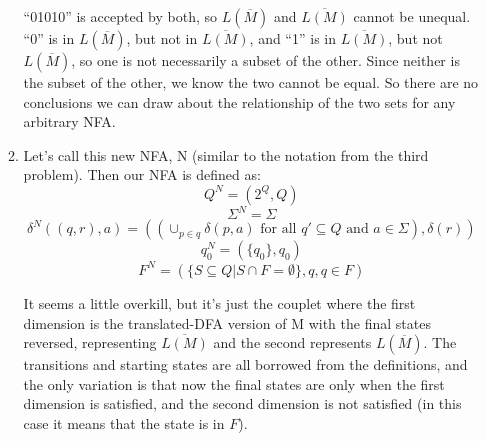 \begin{enumerate}
\begin{enumerate}
\begin{figure}[H]
      \end{figure}
      ``01010'' is accepted by both, so $L(\overline{M})$ and $\overline{L(M)}$ cannot be unequal. ``0'' is in $L(\overline{M})$, but not in $\overline{L(M)}$, and ``1'' is in $\overline{L(M)}$, but not $L(\overline{M})$, so one is not necessarily a subset of the other. Since neither is the subset of the other, we know the two cannot be equal. So there are no conclusions we can draw about the relationship of the two sets for any arbitrary NFA.\\

      \item
        Let's call this new NFA, N (similar to the notation from the third problem). Then our NFA is defined as:
        $$Q^N = (2^Q, Q)$$
        $$\Sigma^N = \Sigma$$
        $$\delta^N((q,r), a) = ( (\cup_{p \in q}\delta(p,a) \text{ for all } q' \subseteq Q \text { and } a \in \Sigma), \delta(r) )$$
        $$q_0^N = (\{q_0\}, q_0)$$
        $$F^N = ( \{S \subseteq Q | S \cap F = \emptyset \}, q, q \in F)$$

        It seems a little overkill, but it's just the couplet where the first dimension is the translated-DFA version of M with the final states reversed, representing $\overline{L(M)}$ and the second represents $L(\overline{M})$. The transitions and starting states are all borrowed from the definitions, and the only variation is that now the final states are only when the first dimension is satisfied, and the second dimension is not satisfied (in this case it means that the state is in $F$).



\end{enumerate}
\end{enumerate}
